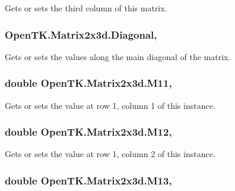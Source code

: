 Gets or sets the third column of this matrix. 

\hypertarget{struct_open_t_k_1_1_matrix2x3d_a13f1b4a449dcaf4bdaeabd2930ce028e}{
\subsubsection[{Diagonal}]{ Open\-T\-K.\-Matrix2x3d.\-Diagonal\hspace{0.3cm}{\ttfamily [get]}, {\ttfamily [set]}}}\label{struct_open_t_k_1_1_matrix2x3d_a13f1b4a449dcaf4bdaeabd2930ce028e}


Gets or sets the values along the main diagonal of the matrix. 

\hypertarget{struct_open_t_k_1_1_matrix2x3d_a31ab31d774da59abb47f594769b35cfc}{
\subsubsection[{M11}]{\setlength{\rightskip}{0pt plus 5cm}double Open\-T\-K.\-Matrix2x3d.\-M11\hspace{0.3cm}{\ttfamily [get]}, {\ttfamily [set]}}}\label{struct_open_t_k_1_1_matrix2x3d_a31ab31d774da59abb47f594769b35cfc}


Gets or sets the value at row 1, column 1 of this instance. 

\hypertarget{struct_open_t_k_1_1_matrix2x3d_a19073ce90be167a7ae353cc2e3855e7e}{
\subsubsection[{M12}]{\setlength{\rightskip}{0pt plus 5cm}double Open\-T\-K.\-Matrix2x3d.\-M12\hspace{0.3cm}{\ttfamily [get]}, {\ttfamily [set]}}}\label{struct_open_t_k_1_1_matrix2x3d_a19073ce90be167a7ae353cc2e3855e7e}


Gets or sets the value at row 1, column 2 of this instance. 

\hypertarget{struct_open_t_k_1_1_matrix2x3d_aa07fe96139bd686b7c95f37ed571b0c6}{
\subsubsection[{M13}]{\setlength{\rightskip}{0pt plus 5cm}double Open\-T\-K.\-Matrix2x3d.\-M13\hspace{0.3cm}{\ttfamily [get]}, {\ttfamily [set]}}}\label{struct_open_t_k_1_1_matrix2x3d_aa07fe96139bd686b7c95f37ed571b0c6}


